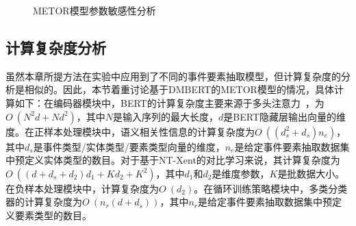 \begin{figure}[t]
\centering
{}
\quad
{}
\quad
{}
\caption{METOR模型参数敏感性分析}
\label{sensitivity}
\end{figure}

\subsection{计算复杂度分析}
虽然本章所提方法在实验中应用到了不同的事件要素抽取模型，但计算复杂度的分析是相似的。因此，本节着重讨论基于DMBERT的METOR模型的情况，具体计算如下：在编码器模块中，BERT的计算复杂度主要来源于多头注意力~\cite{vaswani2017attention}，为$O~(N^2 d+Nd^2)$，其中$N$是输入序列的最大长度，$d$是BERT隐藏层输出向量的维度。在正样本处理模块中，语义相关性信息的计算复杂度为$O~((d_{s}^2 +d_{s})n_{e})$，其中$d_{s}$是事件类型/实体类型/要素类型向量的维度，$n_{e}$是给定事件要素抽取数据集中预定义实体类型的数目。对于基于NT-Xent的对比学习来说，其计算复杂度为$O~((d+d_{s}+d_{2})d_{1}+K d_{2}+K^{2})$，其中$d_{1}$和$d_{2}$是维度参数，$K$是批数据大小。在负样本处理模块中，计算复杂度为$O~(d_{2})$。在循环训练策略模块中，多类分类器的计算复杂度为$O~(n_{r}(d+d_{s}))$，其中$n_{r}$是给定事件要素抽取数据集中预定义要素类型的数目。

